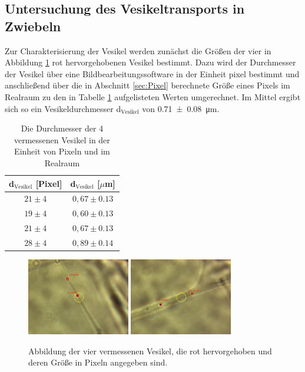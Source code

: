     \newpage
    \subsection{Untersuchung des Vesikeltransports in Zwiebeln}
        \FloatBarrier
        Zur Charakterisierung der Vesikel werden zunächst die Größen der vier in Abbildung \ref{fig:vesikel_size} rot hervorgehobenen Vesikel bestimmt. Dazu wird der Durchmesser der Vesikel über eine 
        Bildbearbeitungssoftware in der Einheit pixel bestimmt und anschließend über die in Abschnitt \ref{sec:Pixel} berechnete Größe eines Pixels im Realraum zu den in Tabelle \ref{tab:d_vesikel} aufgelisteten Werten 
        umgerechnet. Im Mittel ergibt sich so ein Vesikeldurchmesser d$_\text{Vesikel}$ von \SI{0.71(8)}{\micro\metre}.
        \begin{table}[h]
            \centering
            \caption{Die Durchmesser der 4 vermessenen Vesikel in der Einheit von Pixeln und im Realraum}
            \label{tab:d_vesikel}
            \begin{tabular}{c c}
            \toprule
            {d$_\text{Vesikel}$ [Pixel]} & {d$_\text{Vesikel}$ [$\mu$m]}  \\
            \midrule
            $21\pm 4$	 &  $0,67 \pm  0.13$  \\
            $19\pm 4$	 &  $0,60 \pm  0.13$  \\
            $21\pm 4$	 &  $0,67 \pm  0.13$  \\
            $28\pm 4$	 &  $0,89 \pm  0.14$  \\
            \bottomrule
            \end{tabular}
        \end{table}
        \begin{figure}[h]
        \centering
        \includegraphics[width = 0.4\textwidth]{pictures/vesikel_size_1.png}
        \includegraphics[width = 0.4\textwidth]{pictures/vesikel_size_2.png}
        \caption{Abbildung der vier vermessenen Vesikel, die rot hervorgehoben und deren Größe in Pixeln angegeben sind.}
        \label{fig:vesikel_size}
        \end{figure}

